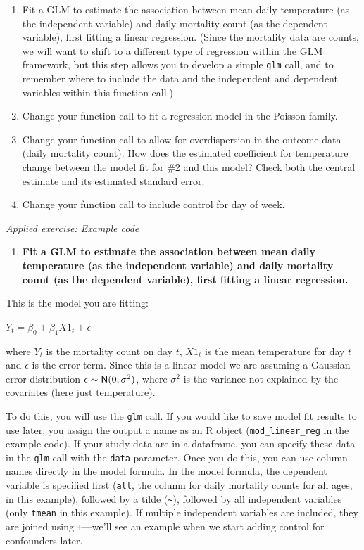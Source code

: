 \documentclass[
]{book}
\providecommand{\tightlist}{%
  \setlength{\itemsep}{0pt}\setlength{\parskip}{0pt}}
\begin{document}
\begin{enumerate}
\def\labelenumi{\arabic{enumi}.}
\tightlist
\item
  Fit a GLM to estimate the association between mean daily temperature (as the
  independent variable) and daily mortality count (as the dependent variable),
  first fitting a linear regression. (Since the mortality data are counts, we will
  want to shift to a different type of regression within the GLM framework, but
  this step allows you to develop a simple \texttt{glm} call, and to remember where to
  include the data and the independent and dependent variables within this
  function call.)
\item
  Change your function call to fit a regression model in the Poisson family.
\item
  Change your function call to allow for overdispersion in the outcome data
  (daily mortality count). How does the estimated coefficient for temperature
  change between the model fit for \#2 and this model? Check both the central
  estimate and its estimated standard error.
\item
  Change your function call to include control for day of week.
\end{enumerate}

\emph{Applied exercise: Example code}

\begin{enumerate}
\def\labelenumi{\arabic{enumi}.}
\tightlist
\item
  \textbf{Fit a GLM to estimate the association between mean daily temperature (as the
  independent variable) and daily mortality count (as the dependent variable),
  first fitting a linear regression.}
\end{enumerate}

This is the model you are fitting:

\(Y_{t}=\beta_{0}+\beta_{1}X1_{t}+\epsilon\)

where \(Y_{t}\) is the mortality count on day \(t\), \(X1_{t}\) is the mean temperature
for day \(t\) and \(\epsilon\) is the error term. Since this is a linear model we are
assuming a Gaussian error distribution \(\epsilon \sim {\sf N}(0, \sigma^{2})\),
where \(\sigma^{2}\) is the variance not explained by the covariates (here just
temperature).

To do this, you will use the \texttt{glm} call. If you would like to save model fit
results to use later, you assign the output a name as an R object
(\texttt{mod\_linear\_reg} in the example code). If your study data are in a dataframe,
you can specify these data in the \texttt{glm} call with the \texttt{data} parameter.
Once you do this, you can use column names directly in the model formula.
In the model formula, the dependent variable is specified first (\texttt{all}, the
column for daily mortality counts for all ages, in this example), followed
by a tilde (\texttt{\textasciitilde{}}), followed by all independent variables (only \texttt{tmean} in this
example). If multiple independent variables are included, they are joined using
\texttt{+}---we'll see an example when we start adding control for confounders later.
\end{document}
